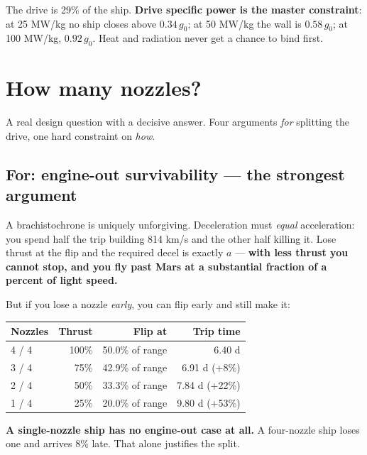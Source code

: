 \documentclass[11pt]{article}
\newcommand{\gz}{g_0}
\begin{document}
\begin{center}
\end{center}

\noindent The drive is 29\% of the ship. \textbf{Drive specific power is the master constraint}: at 25 MW/kg no ship closes above $0.34\,\gz$; at 50 MW/kg the wall is $0.58\,\gz$; at 100 MW/kg, $0.92\,\gz$. Heat and radiation never get a chance to bind first.

\section{How many nozzles?}
A real design question with a decisive answer. Four arguments \emph{for} splitting the drive, one hard constraint on \emph{how}.

\subsection{For: engine-out survivability --- the strongest argument}
A brachistochrone is uniquely unforgiving. Deceleration must \emph{equal} acceleration: you spend half the trip building 814 km/s and the other half killing it. Lose thrust at the flip and the required decel is exactly $a$ --- \textbf{with less thrust you cannot stop, and you fly past Mars at a substantial fraction of a percent of light speed.}

But if you lose a nozzle \emph{early}, you can flip early and still make it:
\begin{center}\small
\begin{tabular}{@{}lrrr@{}}
\toprule
Nozzles & Thrust & Flip at & Trip time\\
\midrule
4 / 4 & 100\% & 50.0\% of range & 6.40 d\\
3 / 4 & 75\%  & 42.9\% of range & 6.91 d \;(+8\%)\\
2 / 4 & 50\%  & 33.3\% of range & 7.84 d \;(+22\%)\\
1 / 4 & 25\%  & 20.0\% of range & 9.80 d \;(+53\%)\\
\bottomrule
\end{tabular}
\end{center}
\textbf{A single-nozzle ship has no engine-out case at all.} A four-nozzle ship loses one and arrives 8\% late. That alone justifies the split.
\end{document}
